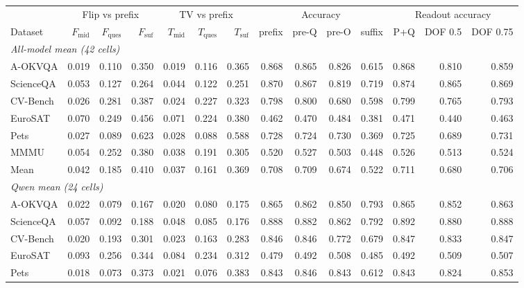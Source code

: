 \begin{tabular}{@{}lrrrrrr rrrr rrr@{}}
\toprule
& \multicolumn{3}{c}{Flip vs prefix} & \multicolumn{3}{c}{TV vs prefix} & \multicolumn{4}{c}{Accuracy} & \multicolumn{3}{c}{Readout accuracy} \\
\cmidrule(lr){2-4}\cmidrule(lr){5-7}\cmidrule(lr){8-11}\cmidrule(l){12-14}
Dataset & $F_{\mathrm{mid}}$ & $F_{\mathrm{ques}}$ & $F_{\mathrm{suf}}$ & $T_{\mathrm{mid}}$ & $T_{\mathrm{ques}}$ & $T_{\mathrm{suf}}$ & prefix & pre-Q & pre-O & suffix & P+Q & DOF 0.5 & DOF 0.75 \\
\midrule
\multicolumn{14}{l}{\textit{All-model mean (42 cells)}}\\
A-OKVQA & 0.019 & 0.110 & 0.350 & 0.019 & 0.116 & 0.365 & 0.868 & 0.865 & 0.826 & 0.615 & 0.868 & 0.810 & 0.859 \\
ScienceQA & 0.053 & 0.127 & 0.264 & 0.044 & 0.122 & 0.251 & 0.870 & 0.867 & 0.819 & 0.719 & 0.874 & 0.865 & 0.869 \\
CV-Bench & 0.026 & 0.281 & 0.387 & 0.024 & 0.227 & 0.323 & 0.798 & 0.800 & 0.680 & 0.598 & 0.799 & 0.765 & 0.793 \\
EuroSAT & 0.070 & 0.249 & 0.456 & 0.071 & 0.224 & 0.380 & 0.462 & 0.470 & 0.484 & 0.381 & 0.471 & 0.440 & 0.463 \\
Pets & 0.027 & 0.089 & 0.623 & 0.028 & 0.088 & 0.588 & 0.728 & 0.724 & 0.730 & 0.369 & 0.725 & 0.689 & 0.731 \\
MMMU & 0.054 & 0.252 & 0.380 & 0.038 & 0.191 & 0.305 & 0.520 & 0.527 & 0.503 & 0.448 & 0.526 & 0.513 & 0.524 \\
Mean & 0.042 & 0.185 & 0.410 & 0.037 & 0.161 & 0.369 & 0.708 & 0.709 & 0.674 & 0.522 & 0.711 & 0.680 & 0.706 \\
\midrule
\multicolumn{14}{l}{\textit{Qwen mean (24 cells)}}\\
A-OKVQA & 0.022 & 0.079 & 0.167 & 0.020 & 0.080 & 0.175 & 0.865 & 0.862 & 0.850 & 0.793 & 0.865 & 0.852 & 0.863 \\
ScienceQA & 0.057 & 0.092 & 0.188 & 0.048 & 0.085 & 0.176 & 0.888 & 0.882 & 0.862 & 0.792 & 0.892 & 0.880 & 0.888 \\
CV-Bench & 0.020 & 0.193 & 0.301 & 0.023 & 0.163 & 0.283 & 0.846 & 0.846 & 0.772 & 0.679 & 0.847 & 0.833 & 0.847 \\
EuroSAT & 0.093 & 0.256 & 0.344 & 0.084 & 0.234 & 0.312 & 0.479 & 0.492 & 0.508 & 0.485 & 0.492 & 0.509 & 0.507 \\
Pets & 0.018 & 0.073 & 0.373 & 0.021 & 0.076 & 0.383 & 0.843 & 0.846 & 0.843 & 0.612 & 0.843 & 0.824 & 0.853 \\

\end{tabular}
